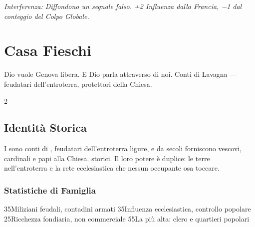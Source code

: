 \textit{Interferenza: Diffondono un segnale falso. +2 Influenza dalla Francia,
−1 dal conteggio del Colpo Globale.}

\chapter{Casa Fieschi}
\label{ch:fieschi}


%
  {Dio vuole Genova libera. E Dio parla attraverso di noi.}%
  {Conti di Lavagna — feudatari dell'entroterra, protettori della Chiesa.}

\begin{multicols}{2}

\section{Identità Storica}
\label{sec:fieschi-identita}

I  sono conti di , feudatari dell'entroterra ligure,
e da secoli forniscono vescovi, cardinali e papi alla Chiesa.
 storici. Il loro potere è duplice: le terre nell'entroterra
e la rete ecclesiastica che nessun occupante osa toccare.

\columnbreak

\subsection{Statistiche di Famiglia}


     {3}{5}{Miliziani feudali, contadini armati}
   {3}{5}{Influenza ecclesiastica, controllo popolare}
 {2}{5}{Ricchezza fondiaria, non commerciale}
 {5}{5}{La più alta: clero e quartieri popolari}

\end{multicols}

